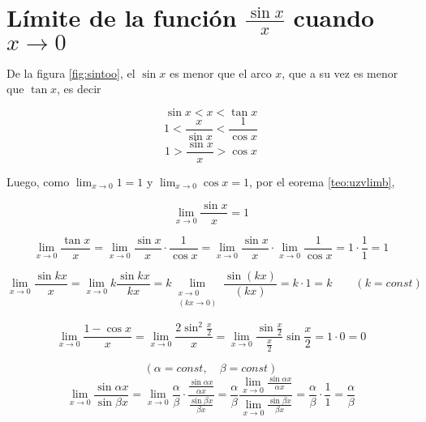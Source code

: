



\section{Límite de la función $\frac {\sin x} {x}$ cuando $x \to 0$}

De la figura \ref{fig:sintoo}, el \( \sin x \) es menor que el arco \( x \), que a su vez es menor que \( \tan x \), es decir

\[ \sin x < x < \tan x \]
\[ 1 < \frac {x} {\sin x} < \frac {1} {\cos x} \]
\[ 1 > \frac {\sin x} {x} > \cos x \]

Luego, como \( \lim_{x \to 0} 1 = 1 \) y \( \lim_{x \to 0} \cos x = 1 \), por el eorema \ref{teo:uzvlimb},

\[ \lim_{x \to 0} \frac {\sin x} {x} = 1 \]


\begin{example}
  \[ \lim_{x \to 0} \frac {\tan x} {x} = \lim_{x \to 0}  \frac {\sin x} {x} \cdot \frac {1} {\cos x} = \lim_{x \to 0} \frac {\sin x} {x} \cdot \lim_{x \to 0} \frac {1} {\cos x} = 1 \cdot \frac{1}{1} = 1\]
\end{example}


\begin{example}
  \[ \lim_{x \to 0} \frac {\sin kx} {x} = \lim_{x \to 0} k \frac {\sin kx} {kx} = k \lim_{\begin{array}{c}x \to 0 \\ (kx \to 0)\end{array}} \frac {\sin(kx)} {(kx)} = k \cdot 1 = k \qquad(k = const)\]
\end{example}


\begin{example}
  \[ \lim_{x \to 0} \frac {1 - \cos x} {x} = \lim_{x \to 0} \frac{2\sin^2\frac{x}{2}} {x} = \lim_{x \to 0} \frac{\sin\frac{x}{2}} {\frac{x}{2}} \sin \frac{x}{2} = 1 \cdot 0 = 0 \]
\end{example}


\begin{example}
  \[ (\alpha = const, \quad \beta = const) \]
  \[ \lim_{x \to 0} \frac {\sin \alpha x} {\sin \beta x} = \lim_{x \to 0} \frac {\alpha} {\beta} \cdot \frac {\frac{\sin \alpha x}{\alpha x}} {\frac {\sin \beta x} {\beta x}} = \frac {\alpha} {\beta} \frac {\lim_{x \to 0}  \frac {\sin \alpha x} {\alpha x}} {\lim_{x \to 0} \frac {\sin \beta x} {\beta x}} = \frac {\alpha} {\beta} \cdot \frac {1} {1} = \frac {\alpha} {\beta} \]
\end{example}




